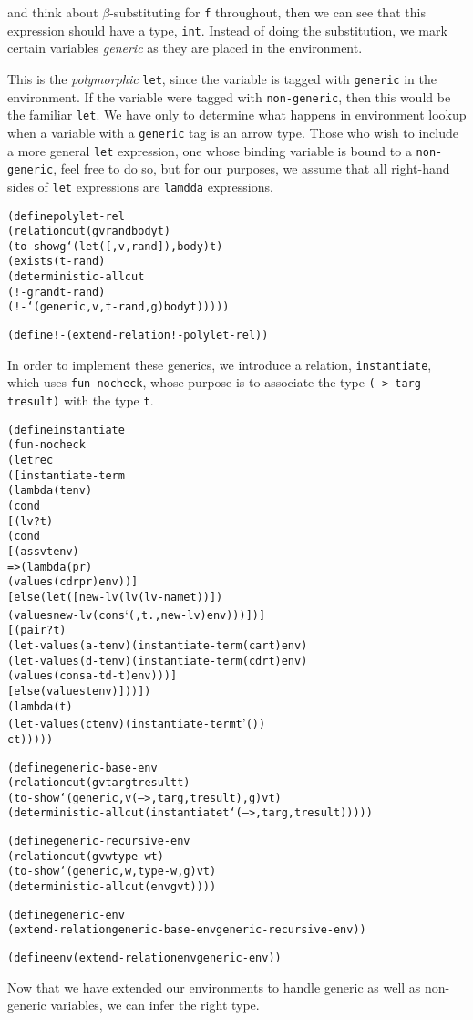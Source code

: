\noindent
and think about $\beta$-substituting for \texttt{f} throughout, then
we can see that this expression should have a type, \texttt{int}.
Instead of doing the substitution, we mark certain variables
\emph{generic} as they are placed in the environment. 

This is the \emph{polymorphic} \texttt{let}, since the variable is
tagged with \texttt{generic} in the environment.  If the variable were
tagged with \texttt{non-generic}, then this would be the familiar
\texttt{let}.  We have only to determine what happens in environment
lookup when a variable with a \texttt{generic} tag is an arrow type.
Those who wish to include a more general \texttt{let} expression, one
whose binding variable is bound to a \texttt{non-generic}, feel free
to do so, but for our purposes, we assume that all right-hand sides of
\texttt{let} expressions are \texttt{lamdda} expressions.

\begin{alltt}
(define polylet-rel
  (relation cut (g v rand body t)
    (to-show g `(let ([,v ,rand]) ,body) t)
    (exists (t-rand)
      (deterministic-all cut
        (!- g rand t-rand)
        (!- `(generic ,v ,t-rand ,g) body t)))))

(define !- (extend-relation !- polylet-rel))
\end{alltt}

In order to implement these generics, we introduce a relation,
\texttt{instantiate}, which uses \texttt{fun-nocheck}, whose purpose
is to associate the type \texttt{(--> targ tresult)} with the type
\texttt{t}.

\begin{alltt}
(define instantiate
  (fun-nocheck
    (letrec
        ([instantiate-term
           (lambda (t env)
             (cond
               [(lv? t)
                (cond
                  [(assv t env)
                   => (lambda (pr)
                        (values (cdr pr) env))]
                  [else (let ([new-lv (lv (lv-name t))])
                          (values new-lv (cons `(,t . ,new-lv) env)))])]
               [(pair? t)
                (let-values (a-t env) (instantiate-term (car t) env)
                  (let-values (d-t env) (instantiate-term (cdr t) env)
                    (values (cons a-t d-t) env)))]
               [else (values t env)]))])
      (lambda (t)
        (let-values (ct env) (instantiate-term t '())
          ct)))))

(define generic-base-env
  (relation cut (g v targ tresult t)
    (to-show `(generic ,v (--> ,targ ,tresult) ,g) v t)
    (deterministic-all cut (instantiate t `(--> ,targ ,tresult)))))

(define generic-recursive-env
  (relation cut (g v w type-w t)
    (to-show `(generic ,w ,type-w ,g) v t)
    (deterministic-all cut (env g v t))))

(define generic-env
  (extend-relation generic-base-env generic-recursive-env))

(define env (extend-relation env generic-env))
\end{alltt}
\newpage
Now that we have extended our environments to handle generic
as well as non-generic variables, we can infer the right type.

